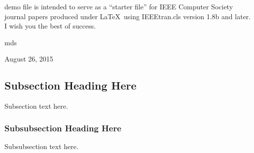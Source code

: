 \documentclass[10pt,journal,compsoc,onecolumn]{IEEEtran}
\begin{document}




% 
% 
% 
% 
 demo file is intended to serve as a ``starter file''
for IEEE Computer Society journal papers produced under \LaTeX\ using
IEEEtran.cls version 1.8b and later.
I wish you the best of success.

\hfill mds
 
\hfill August 26, 2015

\subsection{Subsection Heading Here}
Subsection text here.


\subsubsection{Subsubsection Heading Here}
Subsubsection text here.
\end{document}
